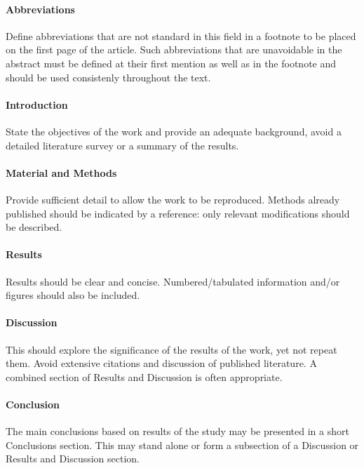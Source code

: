 \paragraph{Abbreviations}

Define abbreviations that are not standard in this field in a footnote to be placed on the first page of the article. Such abbreviations that are unavoidable in the abstract must be defined at their first mention as well as in the footnote and should be used consistenly throughout the text.

\paragraph{Introduction}

State the objectives of the work and provide an adequate background, avoid a detailed literature survey or a summary of the results.

\paragraph{Material and Methods}

Provide sufficient detail to allow the work to be reproduced. Methods already published should be indicated by a reference: only relevant modifications should be described.

\paragraph{Results}

Results should be clear and concise. Numbered/tabulated information and/or figures should also be included.

\paragraph{Discussion}

This should explore the significance of the results of the work, yet not repeat them. Avoid extensive citations and discussion of published literature. A combined section of Results and Discussion is often appropriate.

\paragraph{Conclusion}

The main conclusions based on results of the study may be presented in a short Conclusions section. This may stand alone or form a subsection of a Discussion or Results and Discussion section.

